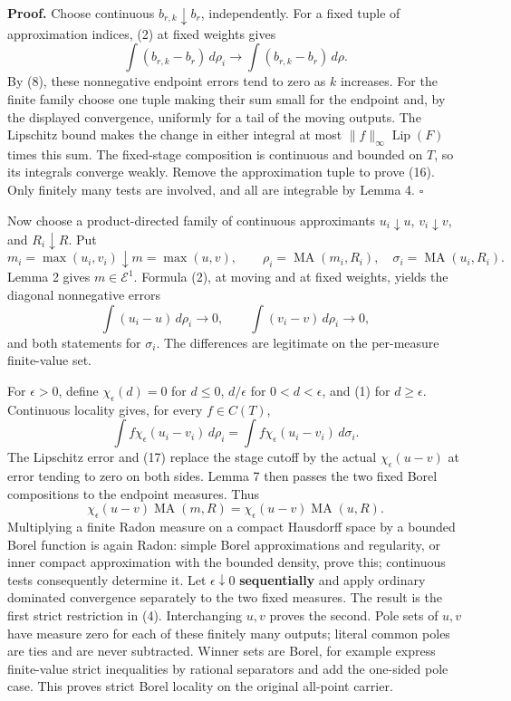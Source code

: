 \documentclass[
]{article}
\begin{document}
\textbf{Proof.} Choose continuous \(b_{r,k}\downarrow b_r\),
independently. For a fixed tuple of approximation indices, (2) at fixed
weights gives \[
\int(b_{r,k}-b_r)\,d\rho_i\longrightarrow\int(b_{r,k}-b_r)\,d\rho.
\] By (8), these nonnegative endpoint errors tend to zero as \(k\)
increases. For the finite family choose one tuple making their sum small
for the endpoint and, by the displayed convergence, uniformly for a tail
of the moving outputs. The Lipschitz bound makes the change in either
integral at most \(\|f\|_\infty\operatorname{Lip}(F)\) times this sum.
The fixed-stage composition is continuous and bounded on \(T\), so its
integrals converge weakly. Remove the approximation tuple to prove (16).
Only finitely many tests are involved, and all are integrable by Lemma
4. \(\square\)

Now choose a product-directed family of continuous approximants
\(u_i\downarrow u\), \(v_i\downarrow v\), and \(R_i\downarrow R\). Put
\[
m_i=\max(u_i,v_i)\downarrow m=\max(u,v),\qquad
\rho_i=\operatorname{MA}(m_i,R_i),\quad \sigma_i=\operatorname{MA}(u_i,R_i).
\] Lemma 2 gives \(m\in\mathcal E^1\). Formula (2), at moving and at
fixed weights, yields the diagonal nonnegative errors \[
\int(u_i-u)\,d\rho_i\to0,\qquad \int(v_i-v)\,d\rho_i\to0,
\tag{17}
\] and both statements for \(\sigma_i\). The differences are legitimate
on the per-measure finite-value set.

For \(\epsilon>0\), define \(\chi_\epsilon(d)=0\) for \(d\leq0\),
\(d/\epsilon\) for \(0<d<\epsilon\), and (1) for \(d\geq\epsilon\).
Continuous locality gives, for every \(f\in C(T)\), \[
\int f\chi_\epsilon(u_i-v_i)\,d\rho_i=\int f\chi_\epsilon(u_i-v_i)\,d\sigma_i.
\] The Lipschitz error and (17) replace the stage cutoff by the actual
\(\chi_\epsilon(u-v)\) at error tending to zero on both sides. Lemma 7
then passes the two fixed Borel compositions to the endpoint measures.
Thus \[
\chi_\epsilon(u-v)\operatorname{MA}(m,R)=\chi_\epsilon(u-v)\operatorname{MA}(u,R).
\] Multiplying a finite Radon measure on a compact Hausdorff space by a
bounded Borel function is again Radon: simple Borel approximations and
regularity, or inner compact approximation with the bounded density,
prove this; continuous tests consequently determine it. Let
\(\epsilon\downarrow0\) \textbf{sequentially} and apply ordinary
dominated convergence separately to the two fixed measures. The result
is the first strict restriction in (4). Interchanging \(u,v\) proves the
second. Pole sets of \(u,v\) have measure zero for each of these
finitely many outputs; literal common poles are ties and are never
subtracted. Winner sets are Borel, for example express finite-value
strict inequalities by rational separators and add the one-sided pole
case. This proves strict Borel locality on the original all-point
carrier.
\end{document}
